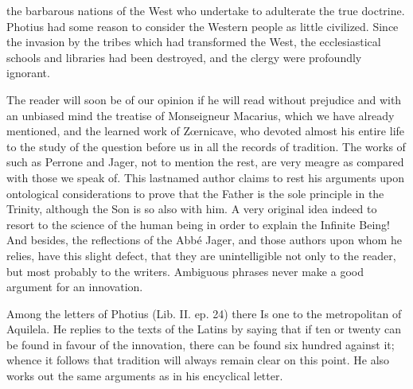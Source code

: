the barbarous nations of the West who undertake to adulterate the true doctrine. Photius had some reason to consider the Western people as little civilized. Since the invasion by the tribes which had transformed the West, the ecclesiastical schools and libraries had been destroyed, and the clergy were profoundly ignorant.

The reader will soon be of our opinion if he will read without prejudice and with an unbiased mind the treatise of Monseigneur Macarius, which we have already mentioned, and the learned work of Zœrnicave, who devoted almost his entire life to the study of the question before us in all the records of tradition. The works of such as Perrone and Jager, not to mention the rest, are very meagre as compared with those we speak of. This lastnamed author claims to rest his arguments upon ontological considerations to prove that the Father is the sole principle in the Trinity, although the Son is so also with him. A very original idea indeed to resort to the science of the human being in order to explain the Infinite Being! And besides, the reflections of the Abbé Jager, and those authors upon whom he relies, have this slight defect, that they are unintelligible not only to the reader, but most probably to the writers. Ambiguous phrases never make a good argument for an innovation.

Among the letters of Photius (Lib. II. ep. 24) there Is one to the metropolitan of Aquilela. He replies to the texts of the Latins by saying that if ten or twenty can be found in favour of the innovation, there can be found six hundred against it; whence it follows that tradition will always remain clear on this point. He also works out the same arguments as in his encyclical letter.

